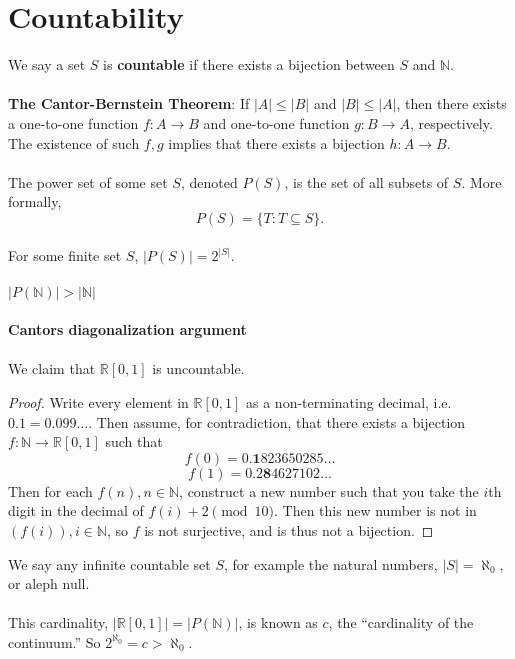 \documentclass{article}
\theoremstyle{definition}
\begin{document}
\section*{Countability}
We say a set $S$ is \textbf{countable} if there exists a bijection between $S$ and $\mathbb{N}$. \\ \\
\textbf{The Cantor-Bernstein Theorem}: If $|A| \leq |B|$ and $|B| \leq |A|$, then there exists a one-to-one function $f: A \rightarrow B$ and one-to-one function $g: B \rightarrow A$, respectively. The existence of such $f, g$ implies that there exists a bijection $h: A \rightarrow B$. \\ \\
The power set of some set $S$, denoted $P(S)$, is the set of all subsets of $S$. More formally, $$P(S) = \{T: T \subseteq S\}.$$ \\
For some finite set $S$, $|P(S)| = 2^{|S|}$. \\ \\
$|P(\mathbb{N})| > |\mathbb{N}|$ \\ \\
\textbf{Cantors diagonalization argument} \\ \\
We claim that $\mathbb{R}[0, 1]$ is uncountable. \begin{proof} Write every element in $\mathbb{R}[0, 1]$ as a non-terminating decimal, i.e. $0.1 = 0.099\dots$. Then assume, for contradiction, that there exists a bijection $f: \mathbb{N} \rightarrow \mathbb{R}[0, 1]$ such that $$f(0) = 0.\textbf{1}823650285 \dots$$ $$f(1) = 0.2\textbf{8}4627102 \dots$$ Then for each $f(n), n \in \mathbb{N}$, construct a new number such that you take the $i$th digit in the decimal of $f(i) + 2 \pmod{10}$. Then this new number is not in $(f(i)), i \in \mathbb{N}$, so $f$ is not surjective, and is thus not a bijection.
\end{proof} $ $ \\
We say any infinite countable set $S$, for example the natural numbers, $|S| = \aleph_0$, or aleph null. \\ \\
This cardinality, $|\mathbb{R}[0, 1]| = |P(\mathbb{N})|$, is known as $c$, the ``cardinality of the continuum.'' So $2^{\aleph_0} = c > \aleph_0$.
\end{document}
